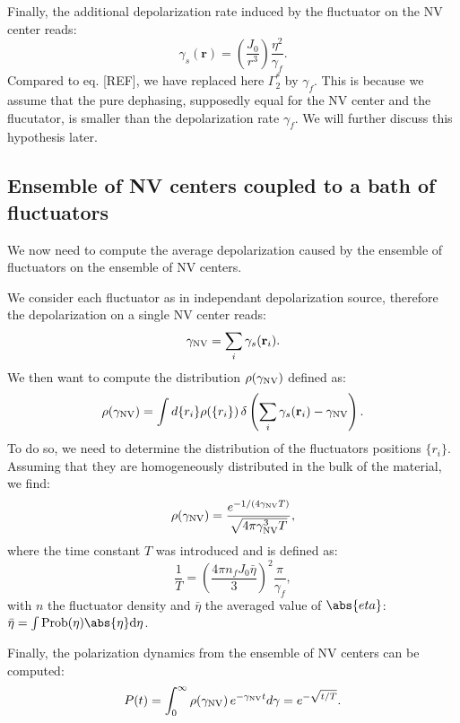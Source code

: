 \documentclass[a4paper,11pt]{report}
\begin{document}
Finally, the additional depolarization rate induced by the fluctuator on the NV center reads:
\begin{equation}
\gamma_s(\mathbf{r})=\left(\frac{J_0}{r^3}\right) \frac{\eta^2}{\gamma_f}.
\end{equation}
Compared to eq. [REF], we have replaced here $\Gamma_2^*$ by $\gamma_f$. This is because we assume that the pure dephasing, supposedly equal for the NV center and the flucutator, is smaller than the depolarization rate $\gamma_f$. We will further discuss this hypothesis later.

\subsection{Ensemble of NV centers coupled to a bath of fluctuators}

We now need to compute the average depolarization caused by the ensemble of fluctuators on the ensemble of NV centers.

We consider each fluctuator as in independant depolarization source, therefore the depolarization on a single NV center reads: 
\begin{equation}
\gamma_{\rm NV}=\sum_i \gamma_s(\mathbf{r}_i).
\end{equation}
We then want to compute the distribution $\rho(\gamma_{\rm NV})$ defined as:
\begin{equation}
\rho(\gamma_{\rm NV})=\int d\{r_i\} \rho(\{r_i\})\, \delta \left( \sum_i \gamma_s(\mathbf{r}_i) - \gamma_{\rm NV} \right).
\end{equation}
To do so, we need to determine the distribution of the fluctuators positions $\{r_i\}$. Assuming that they are homogeneously distributed in the bulk of the material, we find:
\begin{equation}
\rho(\gamma_{\rm NV})=\frac{e^{-1/(4\gamma_{\rm NV} T)}}{\sqrt{4\pi \gamma_{\rm NV}^3 T}},
\end{equation}
where the time constant $T$ was introduced and is defined as:
\begin{equation}
\frac{1}{T}=\left(\frac{4\pi n_fJ_0\bar \eta}{3}\right)^2 \frac{\pi}{\gamma_f},
\label{eq 1/T}
\end{equation}
with $n$ the fluctuator density and $\bar \eta$ the averaged value of $\abs{eta}$: $\bar \eta = \int \rm{Prob}(\eta) \abs{\eta} d\eta$.

Finally, the polarization dynamics from the ensemble of NV centers can be computed:
\begin{equation}
P(t)=\int_0^\infty \rho(\gamma_{\rm NV})\, e^{-\gamma_{\rm NV} t}d\gamma= e^{-\sqrt{t/T}}.
\end{equation}
\end{document}
